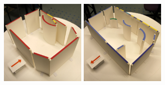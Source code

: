 \documentclass[review]{vgtc}                 %
\begin{document}
\begin{figure}[t]
\begin{minipage}[c]{3.33in}
  \includegraphics[width=1.65in]{images/photos/38_renovation} %
  \includegraphics[width=1.65in]{images/photos/42_renovation} %
\end{minipage}
\begin{minipage}[c]{4.9in}


\end{minipage}
\end{figure}
\end{document}
